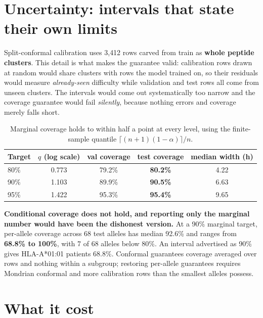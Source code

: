 \documentclass[11pt,a4paper]{article}
\begin{document}
\section{Uncertainty: intervals that state their own limits}

Split-conformal calibration \citep{lei2018conformal} uses 3{,}412 rows carved from train as
\textbf{whole peptide clusters}. This detail is what makes the guarantee valid: calibration rows
drawn at random would share clusters with rows the model trained on, so their residuals would
measure \emph{already-seen} difficulty while validation and test rows all come from unseen
clusters. The intervals would come out systematically too narrow and the coverage guarantee would
fail \emph{silently}, because nothing errors and coverage merely falls short.

\begin{table}[H]
\centering\small
\begin{tabular}{@{}lcccc@{}}
\toprule
\textbf{Target} & $q$ \textbf{(log scale)} & \textbf{val coverage} & \textbf{test coverage} & \textbf{median width (h)} \\
\midrule
80\% & 0.773 & 79.2\% & \textbf{80.2\%} & 4.22 \\
90\% & 1.103 & 89.9\% & \textbf{90.5\%} & 6.63 \\
95\% & 1.422 & 95.3\% & \textbf{95.4\%} & 9.65 \\
\bottomrule
\end{tabular}
\caption{Marginal coverage holds to within half a point at every level, using the finite-sample
quantile $\lceil (n+1)(1-\alpha)\rceil / n$.}
\end{table}

\textbf{Conditional coverage does not hold, and reporting only the marginal number would have been
the dishonest version.} At a 90\% marginal target, per-allele coverage across 68 test alleles has
median 92.6\% and ranges from \textbf{68.8\% to 100\%}, with 7 of 68 alleles below 80\%. An
interval advertised as 90\% gives HLA-A*01:01 patients 68.8\%. Conformal guarantees coverage
averaged over rows and nothing within a subgroup; restoring per-allele guarantees requires
Mondrian conformal and more calibration rows than the smallest alleles possess.

\section{What it cost}
\end{document}

